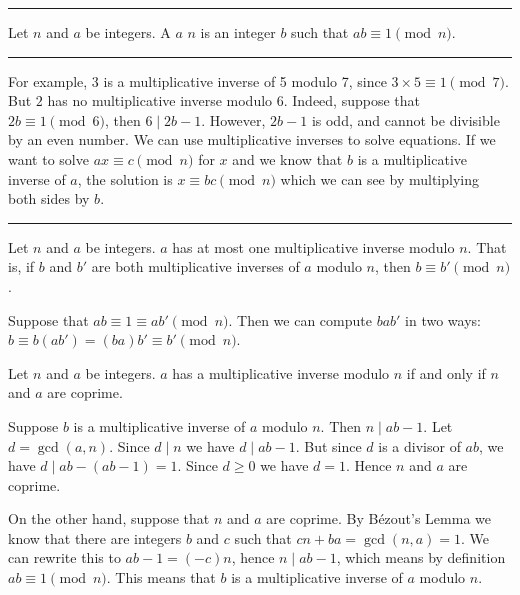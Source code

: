 \documentclass[letterpaper,10pt,english]{sphinxmanual}
\begin{document}
\bigskip\hrule\bigskip


\sphinxAtStartPar
{} Let \(n\) and \(a\) be integers. A  \(a\)  \(n\) is an integer \(b\) such that \(ab \equiv 1\pmod{n}\).


\bigskip\hrule\bigskip


\sphinxAtStartPar
For example, 3 is a multiplicative inverse of 5 modulo 7, since \(3\times 5\equiv1\pmod{7}\). But \(2\) has no multiplicative inverse modulo 6. Indeed, suppose that \(2b\equiv 1 \pmod{6}\), then \(6 \mid 2b-1\). However, \(2b-1\) is odd, and cannot be divisible by an even number. We can use multiplicative inverses to solve equations. If we want to solve \(ax\equiv c \pmod{n}\) for \(x\) and we know that \(b\) is a multiplicative inverse of \(a\), the solution is \(x\equiv bc \pmod{n}\) which we can see by multiplying both sides by \(b\).


\bigskip\hrule\bigskip


\sphinxAtStartPar
{} Let \(n\) and \(a\) be integers. \(a\) has at most one multiplicative inverse modulo \(n\). That is, if \(b\) and \(b'\) are both multiplicative inverses of \(a\) modulo \(n\), then \(b\equiv b'\pmod{n}\).

\sphinxAtStartPar
{} Suppose that \(ab\equiv 1 \equiv ab' \pmod{n}\). Then we can compute \(bab'\) in two ways: \(b \equiv b(ab') = (ba)b' \equiv b' \pmod{n}\).

\sphinxAtStartPar
{} Let \(n\) and \(a\) be integers. \(a\) has a multiplicative inverse modulo \(n\) if and only if \(n\) and \(a\) are coprime.

\sphinxAtStartPar
{} Suppose \(b\) is a multiplicative inverse of \(a\) modulo \(n\). Then \(n \mid ab - 1\). Let \(d = \gcd(a, n)\). Since \(d \mid n\) we have \(d \mid ab-1\). But since \(d\) is a divisor of \(ab\), we have \(d \mid ab - (ab-1) = 1\). Since \(d\geq0\) we have \(d=1\). Hence \(n\) and \(a\) are coprime.

\sphinxAtStartPar
On the other hand, suppose that \(n\) and \(a\) are coprime. By B‎ézout’s Lemma we know that there are integers \(b\) and \(c\) such that \(cn+ba=\gcd(n,a)=1\). We can rewrite this to \(ab - 1 = (-c)n\), hence \(n \mid ab - 1\), which means by definition \(ab \equiv 1 \pmod{n}\). This means that \(b\) is a multiplicative inverse of \(a\) modulo \(n\).
\end{document}
